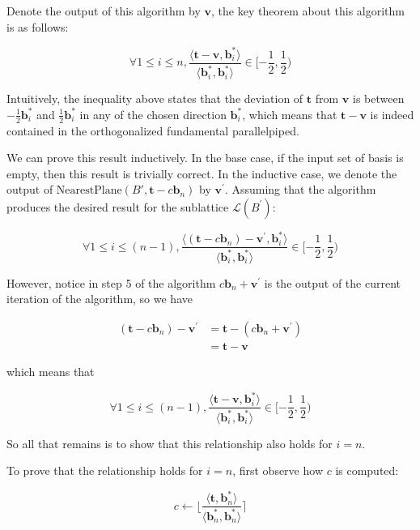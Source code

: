 \documentclass[letterpaper,12pt]{article}
\begin{document}
Denote the output of this algorithm by $\mathbf{v}$, the key theorem about this algorithm is as follows:

$$
\forall 1 \leq i \leq n, 
\frac{
    \langle
        \mathbf{t} - \mathbf{v}, \mathbf{b}_i^\ast
    \rangle
}{
    \langle
        \mathbf{b}_i^\ast, \mathbf{b}_i^\ast
    \rangle
} 
\in [-\frac{1}{2}, \frac{1}{2})
$$

Intuitively, the inequality above states that the deviation of $\mathbf{t}$ from $\mathbf{v}$ is between $-\frac{1}{2}\mathbf{b}_i^\ast$ and $\frac{1}{2}\mathbf{b}_i^\ast$ in any of the chosen direction $\mathbf{b}_i^\ast$, which means that $\mathbf{t} - \mathbf{v}$ is indeed contained in the orthogonalized fundamental parallelpiped.

We can prove this result inductively. In the base case, if the input set of basis is empty, then this result is trivially correct. In the inductive case, we denote the output of $\text{NearestPlane}(B', \mathbf{t} - c\mathbf{b}_n)$ by $\mathbf{v}^\prime$. Assuming that the algorithm produces the desired result for the sublattice $\mathcal{L}(B^\prime)$:

$$
\forall 1 \leq i \leq (n-1), 
\frac{
    \langle
        (\mathbf{t} - c\mathbf{b}_n) - \mathbf{v}^\prime, 
        \mathbf{b}_i^\ast
    \rangle
}{
    \langle
        \mathbf{b}_i^\ast, \mathbf{b}_i^\ast
    \rangle
} \in [-\frac{1}{2}, \frac{1}{2})
$$

However, notice in step 5 of the algorithm $c\mathbf{b}_n + \mathbf{v}^\prime$ is the output of the current iteration of the algorithm, so we have

$$
\begin{aligned}
(\mathbf{t} - c\mathbf{b}_n) - \mathbf{v}^\prime 
&= \mathbf{t} - (c\mathbf{b}_n + \mathbf{v}^\prime) \\
&= \mathbf{t} - \mathbf{v}
\end{aligned}
$$

which means that

$$
\forall 1 \leq i \leq (n-1), 
\frac{
    \langle
        \mathbf{t} - \mathbf{v}, 
        \mathbf{b}_i^\ast
    \rangle
}{
    \langle
        \mathbf{b}_i^\ast, \mathbf{b}_i^\ast
    \rangle
} \in [-\frac{1}{2}, \frac{1}{2})
$$

So all that remains is to show that this relationship also holds for $i = n$.

To prove that the relationship holds for $i = n$, first observe how $c$ is computed:

$$
c \leftarrow \lfloor \frac{\langle\mathbf{t}, \mathbf{b}_n^\ast\rangle}{\langle\mathbf{b}_n^\ast, \mathbf{b}_n^\ast\rangle} \rceil
$$
\end{document}
